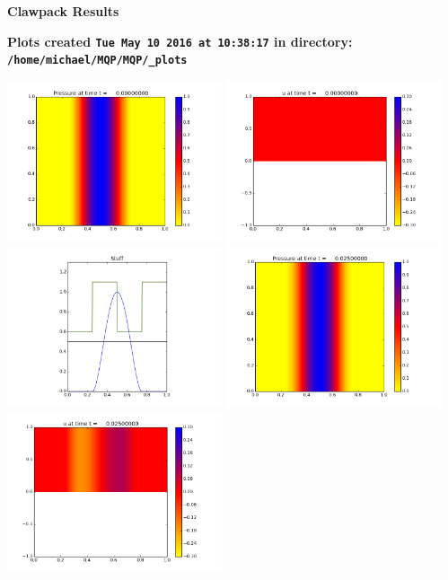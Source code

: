 \documentclass[11pt]{article}
\begin{document}
        \begin{center}{\Large\bf Clawpack Results}\vskip 5pt
        
        \bf Plots created {\tt Tue May 10 2016 at 10:38:17} in directory: \vskip 5pt
        \verb+/home/michael/MQP/MQP/_plots+
        \end{center}
        \vskip 5pt
        \includegraphics[width=0.475\textwidth]{frame0000fig0.png}
\includegraphics[width=0.475\textwidth]{frame0000fig1.png}
\vskip 10pt 
\includegraphics[width=0.475\textwidth]{frame0000fig3.png}
\vskip 10pt 
\includegraphics[width=0.475\textwidth]{frame0001fig0.png}
\includegraphics[width=0.475\textwidth]{frame0001fig1.png}
\end{document}
